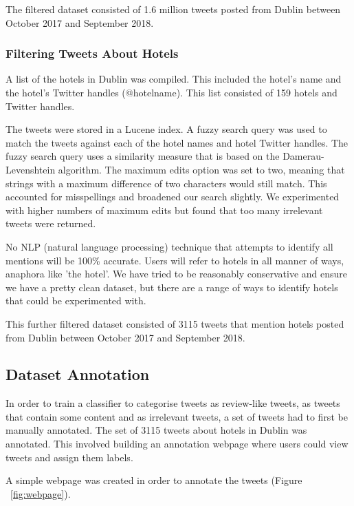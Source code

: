 The filtered dataset consisted of 1.6 million tweets posted from Dublin between October 2017 and September 2018.

\subsubsection{Filtering Tweets About Hotels}
A list of the hotels in Dublin was compiled. This included the hotel's name and the hotel's Twitter handles (@hotelname). This list consisted of 159 hotels and Twitter handles.

The tweets were stored in a Lucene index. A fuzzy search query was used to match the tweets against each of the hotel names and hotel Twitter handles. The fuzzy search query uses a similarity measure that is based on the Damerau-Levenshtein algorithm. The maximum edits option was set to two, meaning that strings with a maximum difference of two characters would still match. This accounted for misspellings and broadened our search slightly. We experimented with higher numbers of maximum edits but found that too many irrelevant tweets were returned.

No NLP (natural language processing) technique that attempts to identify all mentions will be 100\% accurate. Users will refer to hotels in all manner of ways, anaphora like 'the hotel'. We have tried to be reasonably conservative and ensure we have a pretty clean dataset, but there are a range of ways to identify hotels that could be experimented with. 

This further filtered dataset consisted of 3115 tweets that mention hotels posted from Dublin between October 2017 and September 2018.

\subsection{Dataset Annotation}

In order to train a classifier to categorise tweets as review-like tweets, as tweets that contain some content and as irrelevant tweets, a set of tweets had to first be manually annotated. The set of 3115 tweets about hotels in Dublin was annotated. This involved building an annotation webpage where users could view tweets and assign them labels.

A simple webpage was created in order to annotate the tweets (Figure ~\ref{fig:webpage}). 

